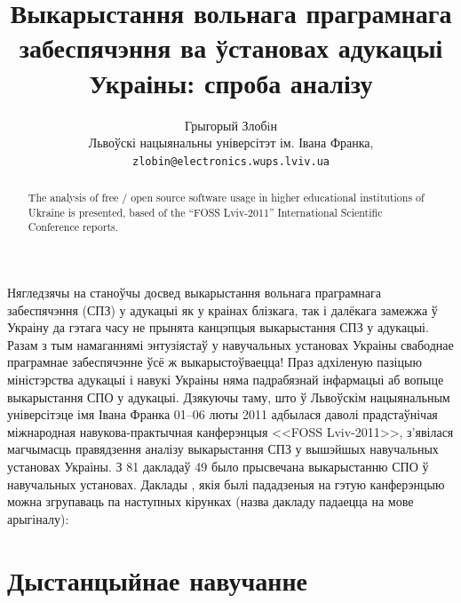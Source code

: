 \documentclass[10pt, a5paper]{article}
\begin{document}
\renewcommand{\figurename}{Рыс.} %
\renewcommand{\abstractname}{Анатацыя}
\renewcommand{\refname}{Літаратура}

\title{Выкарыстання вольнага праграмнага забеспячэння ва ўстановах адукацыі Украіны: спроба аналізу}

\author{Грыгорый Злобiн\\
\small Львоўскі нацыянальны універсітэт ім. Івана Франка,\\
\small \texttt{zlobin@electronics.wups.lviv.ua}
}
\date{}

\maketitle

\begin{abstract}
The analysis of free / open source software usage in higher educational institutions of Ukraine is presented, based of the ``FOSS Lviv-2011''  International Scientific Conference reports. 
\end{abstract}

Нягледзячы на станоўчы досвед выкарыстання вольнага праграмнага забеспячэння (СПЗ) у адукацыі як у краінах блізкага, так і далёкага замежжа ў Украіну да гэтага часу не прынята канцэпцыя выкарыстання СПЗ у адукацыі. Разам з тым намаганнямі энтузіястаў у навучальных установах Украіны свабоднае праграмнае забеспячэнне ўсё ж выкарыстоўваецца! Праз адхіленую пазіцыю міністэрства адукацыі і навукі Украіны няма падрабязнай інфармацыі аб вопыце выкарыстання СПО у адукацыі. Дзякуючы таму, што ў Львоўскім нацыянальным універсітэце імя Івана Франка 01--06 люты 2011 адбылася даволі прадстаўнічая міжнародная навукова-практычная канферэнцыя <<FOSS Lviv-2011>>, з'явілася магчымасць правядзення аналізу выкарыстання СПЗ у вышэйшых навучальных установах Украіны. З 81 дакладаў 49 было прысвечана выкарыстанню СПО ў навучальных установах. Даклады \cite{fosslviv}, якія былі пададзеныя на гэтую канферэнцыю можна згрупаваць па наступных кірунках (назва дакладу падаецца на мове арыгіналу):

\section{Дыстанцыйнае навучанне}
\end{document}
